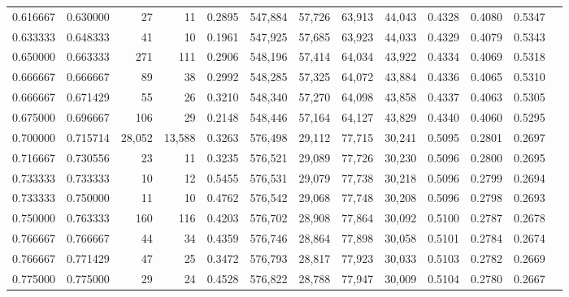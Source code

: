 \begin{tabular}{rrrrrrrrrrrrr}
0.616667 & 0.630000 &     27 &     11 &                                     0.2895 & 547,884 &  57,726 &  63,913 &  44,043 & 0.4328 & 0.4080 & 0.5347 \\
0.633333 & 0.648333 &     41 &     10 &                                     0.1961 & 547,925 &  57,685 &  63,923 &  44,033 & 0.4329 & 0.4079 & 0.5343 \\
0.650000 & 0.663333 &    271 &    111 &                                     0.2906 & 548,196 &  57,414 &  64,034 &  43,922 & 0.4334 & 0.4069 & 0.5318 \\
0.666667 & 0.666667 &     89 &     38 &                                     0.2992 & 548,285 &  57,325 &  64,072 &  43,884 & 0.4336 & 0.4065 & 0.5310 \\
0.666667 & 0.671429 &     55 &     26 &                                     0.3210 & 548,340 &  57,270 &  64,098 &  43,858 & 0.4337 & 0.4063 & 0.5305 \\
0.675000 & 0.696667 &    106 &     29 &                                     0.2148 & 548,446 &  57,164 &  64,127 &  43,829 & 0.4340 & 0.4060 & 0.5295 \\
0.700000 & 0.715714 & 28,052 & 13,588 &                                     0.3263 & 576,498 &  29,112 &  77,715 &  30,241 & 0.5095 & 0.2801 & 0.2697 \\
0.716667 & 0.730556 &     23 &     11 &                                     0.3235 & 576,521 &  29,089 &  77,726 &  30,230 & 0.5096 & 0.2800 & 0.2695 \\
0.733333 & 0.733333 &     10 &     12 &                                     0.5455 & 576,531 &  29,079 &  77,738 &  30,218 & 0.5096 & 0.2799 & 0.2694 \\
0.733333 & 0.750000 &     11 &     10 &                                     0.4762 & 576,542 &  29,068 &  77,748 &  30,208 & 0.5096 & 0.2798 & 0.2693 \\
0.750000 & 0.763333 &    160 &    116 &                                     0.4203 & 576,702 &  28,908 &  77,864 &  30,092 & 0.5100 & 0.2787 & 0.2678 \\
0.766667 & 0.766667 &     44 &     34 &                                     0.4359 & 576,746 &  28,864 &  77,898 &  30,058 & 0.5101 & 0.2784 & 0.2674 \\
0.766667 & 0.771429 &     47 &     25 &                                     0.3472 & 576,793 &  28,817 &  77,923 &  30,033 & 0.5103 & 0.2782 & 0.2669 \\
0.775000 & 0.775000 &     29 &     24 &                                     0.4528 & 576,822 &  28,788 &  77,947 &  30,009 & 0.5104 & 0.2780 & 0.2667 \\

\end{tabular}
